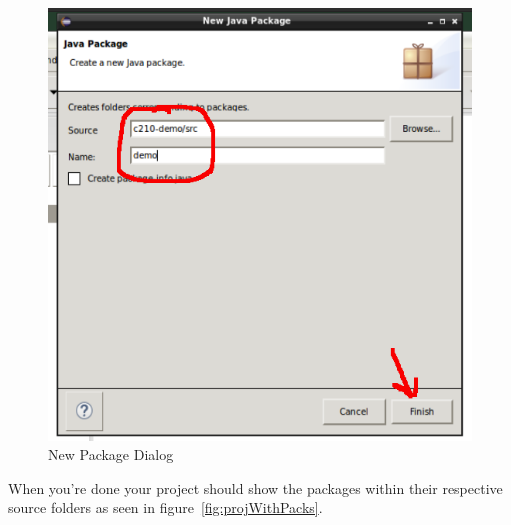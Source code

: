 \documentclass[nobib]{tufte-handout}
\begin{document}
\vspace{.1in}
\begin{center}
\begin{figure}[h]
\includegraphics[scale=.5]{Eclipse-NewPackage.png}
\caption{New Package Dialog}
\label{fig:newpackage}
\end{figure}
\end{center}
\vspace{.1in}


When you're done your project should show the packages within their respective source folders as seen in figure~\ref{fig:projWithPacks}.
\end{document}
